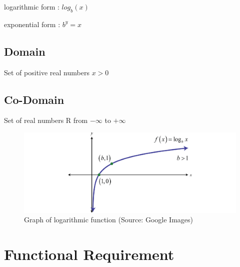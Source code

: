 \documentclass[12pt]{report}
\begin{document}
\begin{center}
 logarithmic form :  $log_b (x)$
\end{center}

\begin{center}
exponential form : $b^y = x$
\end{center}


\subsection{Domain}
    
    \begin{center}
      Set of positive real numbers  $ x > 0 $
    \end{center}
    
\subsection{Co-Domain}
\begin{center}
    Set of real numbers R from $-\infty$  to $+\infty$\\[0.5 cm] 
\end{center}

\begin{figure}[h!]
\begin{center}
  \includegraphics[width=\columnwidth]{Log.png}
  \end{center}
  \caption{Graph of logarithmic function (Source: Google Images)}
\end{figure}


\section{Functional Requirement}
\end{document}
